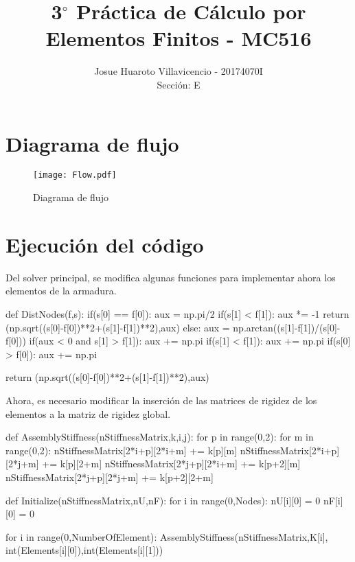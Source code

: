 \documentclass[12pt,a4paper]{article}
\author{Josue Huaroto Villavicencio - 20174070I\\Sección: E}
\title{3$^{\circ}$ Práctica de Cálculo por Elementos Finitos - MC516}
\begin{document}
\maketitle
\section{Diagrama de flujo}
\begin{figure}[H]
    \centering
    \texttt{[image: Flow.pdf]}
    \caption{Diagrama de flujo}
\end{figure}
\section{Ejecución del código}
Del solver principal, se modifica algunas funciones para implementar ahora los elementos de la armadura.
\begin{pyglist}[language=python,caption={Cálculo de la longitud y el ángulo entre nodos},style=pastie]
def DistNodes(f,s):
    if(s[0] == f[0]):
        aux = np.pi/2
        if(s[1] < f[1]):
             aux *= -1
        return (np.sqrt((s[0]-f[0])**2+(s[1]-f[1])**2),aux)
    else:
        aux = np.arctan((s[1]-f[1])/(s[0]-f[0]))
    if(aux < 0 and s[1] > f[1]):
        aux += np.pi
    if(s[1] < f[1]):
        aux += np.pi
        if(s[0] > f[0]):
            aux += np.pi

    return (np.sqrt((s[0]-f[0])**2+(s[1]-f[1])**2),aux)
\end{pyglist}
Ahora, es necesario modificar la inserción de las matrices de rigidez de los elementos a la matriz de rigidez global.
\begin{pyglist}[language=python,caption={Ensamble de la matriz de rigidez},style=pastie]
def AssemblyStiffness(nStiffnessMatrix,k,i,j):
    for p in range(0,2):
        for m in range(0,2):
            nStiffnessMatrix[2*i+p][2*i+m] += k[p][m]
            nStiffnessMatrix[2*i+p][2*j+m] += k[p][2+m]
            nStiffnessMatrix[2*j+p][2*i+m] += k[p+2][m]
            nStiffnessMatrix[2*j+p][2*j+m] += k[p+2][2+m]
 
def Initialize(nStiffnessMatrix,nU,nF):
    for i in range(0,Nodes):
        nU[i][0] = 0
        nF[i][0] = 0
        
    for i in range(0,NumberOfElement):
        AssemblyStiffness(nStiffnessMatrix,K[i],
        int(Elements[i][0]),int(Elements[i][1]))
\end{pyglist}
\end{document}
